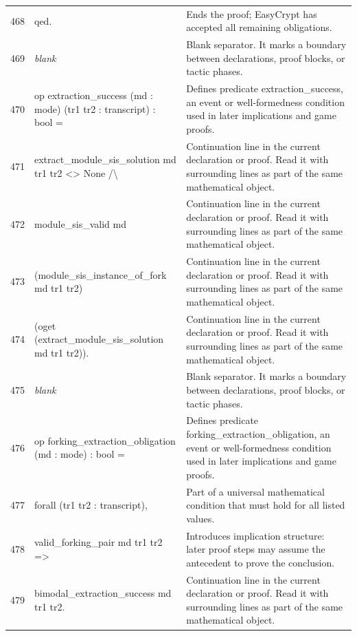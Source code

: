 \documentclass[10pt]{article}
\begin{document}
\begin{longtable}{r L{0.53\textwidth} L{0.37\textwidth}}
468 & {\ttfamily\scriptsize qed.} & Ends the proof; EasyCrypt has accepted all remaining obligations. \\
469 & {\ttfamily\scriptsize \emph{blank}} & Blank separator.  It marks a boundary between declarations, proof blocks, or tactic phases. \\
470 & {\ttfamily\scriptsize op extraction\_success (md : mode) (tr1 tr2 : transcript) : bool =} & Defines predicate extraction\_success, an event or well-formedness condition used in later implications and game proofs. \\
471 & {\ttfamily\scriptsize   extract\_module\_sis\_solution md tr1 tr2 <> None /\textbackslash{}} & Continuation line in the current declaration or proof.  Read it with surrounding lines as part of the same mathematical object. \\
472 & {\ttfamily\scriptsize   module\_sis\_valid md} & Continuation line in the current declaration or proof.  Read it with surrounding lines as part of the same mathematical object. \\
473 & {\ttfamily\scriptsize     (module\_sis\_instance\_of\_fork md tr1 tr2)} & Continuation line in the current declaration or proof.  Read it with surrounding lines as part of the same mathematical object. \\
474 & {\ttfamily\scriptsize     (oget (extract\_module\_sis\_solution md tr1 tr2)).} & Continuation line in the current declaration or proof.  Read it with surrounding lines as part of the same mathematical object. \\
475 & {\ttfamily\scriptsize \emph{blank}} & Blank separator.  It marks a boundary between declarations, proof blocks, or tactic phases. \\
476 & {\ttfamily\scriptsize op forking\_extraction\_obligation (md : mode) : bool =} & Defines predicate forking\_extraction\_obligation, an event or well-formedness condition used in later implications and game proofs. \\
477 & {\ttfamily\scriptsize   forall (tr1 tr2 : transcript),} & Part of a universal mathematical condition that must hold for all listed values. \\
478 & {\ttfamily\scriptsize     valid\_forking\_pair md tr1 tr2 =>} & Introduces implication structure: later proof steps may assume the antecedent to prove the conclusion. \\
479 & {\ttfamily\scriptsize     bimodal\_extraction\_success md tr1 tr2.} & Continuation line in the current declaration or proof.  Read it with surrounding lines as part of the same mathematical object. \\

\end{longtable}
\end{document}
